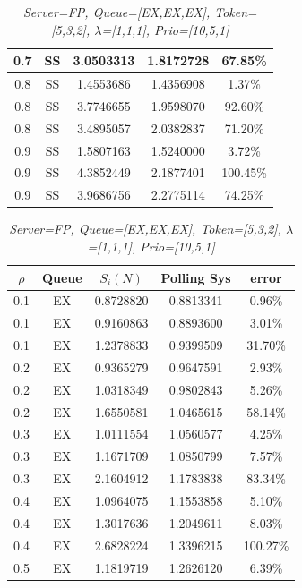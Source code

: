 \documentclass[12pt,a4paper,italian]{article}
\begin{document}
\begin{table}[ht!]
\begin{minipage}[b]{0.48\linewidth}
\begin{tabular}{c c c c c}
			0.7 & SS & 3.0503313 &   1.8172728    & 67.85\%  \\ \hline \hline
			0.8 & SS & 1.4553686 &   1.4356908    &  1.37\%  \\
			0.8 & SS & 3.7746655 &   1.9598070    & 92.60\%  \\
			0.8 & SS & 3.4895057 &   2.0382837    & 71.20\%  \\ \hline \hline
			0.9 & SS & 1.5807163 &   1.5240000    &  3.72\%  \\
			0.9 & SS & 4.3852449 &   2.1877401    & 100.45\% \\
			0.9 & SS & 3.9686756 &   2.2775114    & 74.25\%  \\\hline
			
		\end{tabular}
	\end{minipage}
	\hspace{0.5cm}
	\begin{minipage}[b]{0.48\linewidth}
		\centering
		\caption{\scriptsize \emph{Server=FP, Queue=[EX,EX,EX], Token=[5,3,2], $\lambda$=[1,1,1], Prio=[10,5,1]}}
		\label{tab14}
		\tiny
		\begin{tabular}{c c c c c}
			\hline
			$\rho$ & Queue & $S_i(N)$ & Polling Sys & error \\ \hline
			  0.1 & EX & 0.8728820 &   0.8813341    &  0.96\%  \\
			  0.1 & EX & 0.9160863 &   0.8893600    &  3.01\%  \\
			  0.1 & EX & 1.2378833 &   0.9399509    & 31.70\%  \\ \hline \hline
			  0.2 & EX & 0.9365279 &   0.9647591    &  2.93\%  \\
			  0.2 & EX & 1.0318349 &   0.9802843    &  5.26\%  \\
			  0.2 & EX & 1.6550581 &   1.0465615    & 58.14\%  \\ \hline \hline
			  0.3 & EX & 1.0111554 &   1.0560577    &  4.25\%  \\
			  0.3 & EX & 1.1671709 &   1.0850799    &  7.57\%  \\
			  0.3 & EX & 2.1604912 &   1.1783838    & 83.34\%  \\ \hline \hline
			  0.4 & EX & 1.0964075 &   1.1553858    &  5.10\%  \\
			  0.4 & EX & 1.3017636 &   1.2049611    &  8.03\%  \\
			  0.4 & EX & 2.6828224 &   1.3396215    & 100.27\% \\ \hline \hline
			  0.5 & EX & 1.1819719 &   1.2626120    &  6.39\%  \\

\end{tabular}
\end{minipage}
\end{table}
\end{document}
